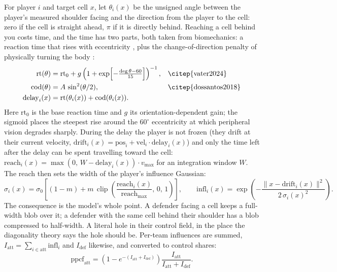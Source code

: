 \documentclass[11pt]{article}
\begin{document}
For player $i$ and target cell $x$, let $\theta_i(x)$ be the unsigned
angle between the player's measured shoulder facing and the direction from
the player to the cell: zero if the cell is straight ahead, $\pi$ if it
is directly behind. Reaching a cell behind you costs time, and the time
has two parts, both taken from biomechanics: a reaction time that
rises with eccentricity \citep{vater2024}, plus the
change-of-direction penalty of physically turning the body
\citep{dossantos2018}:
\begin{align}
  \mathrm{rt}(\theta)  &= \mathrm{rt}_0
     + g\left(1+\exp\!\left[-\tfrac{\deg\theta - 60}{15}\right]\right)^{-1},
     &&\text{\citep{vater2024}}\\
  \mathrm{cod}(\theta) &= A\,\sin^2(\theta/2), &&\text{\citep{dossantos2018}}\\
  \mathrm{delay}_i(x)  &= \mathrm{rt}(\theta_i(x)) + \mathrm{cod}(\theta_i(x)).
\end{align}
Here $\mathrm{rt}_0$ is the base reaction time and $g$ its
orientation-dependent gain; the sigmoid places the steepest rise around
the $60^\circ$ eccentricity at which peripheral vision degrades sharply.
During the delay the player is not frozen (they drift at their current
velocity, $\mathrm{drift}_i(x) = \mathrm{pos}_i +
\mathrm{vel}_i\cdot\mathrm{delay}_i(x)$) and only the time left after
the delay can be spent travelling toward the cell:
$\mathrm{reach}_i(x) = \max(0,\,W-\mathrm{delay}_i(x))\cdot v_{\max}$ for
an integration window $W$. The reach then sets the width of the player's
influence Gaussian:
\begin{equation}
  \sigma_i(x) = \sigma_0\left[(1-m) + m\,\operatorname{clip}\!\left(\frac{\mathrm{reach}_i(x)}{\mathrm{reach}_{\max}},\,0,\,1\right)\right],
  \qquad
  \mathrm{infl}_i(x) = \exp\!\left(-\frac{\lVert x-\mathrm{drift}_i(x)\rVert^2}{2\,\sigma_i(x)^2}\right).
\end{equation}
The consequence is the model's whole point. A defender facing a cell keeps
a full-width blob over it; a defender with the same cell behind their
shoulder has a blob compressed to half-width. A literal hole in their
control field, in the place the diagonality theory says the hole should
be. Per-team influences are summed, $I_\mathrm{att} =
\sum_{i\in\mathrm{att}}\mathrm{infl}_i$ and $I_\mathrm{def}$ likewise, and
converted to control shares:
\begin{equation}
  \mathrm{ppcf}_\mathrm{att} =
  \left(1-e^{-(I_\mathrm{att}+I_\mathrm{def})}\right)
  \frac{I_\mathrm{att}}{I_\mathrm{att}+I_\mathrm{def}}.
\end{equation}
\end{document}
